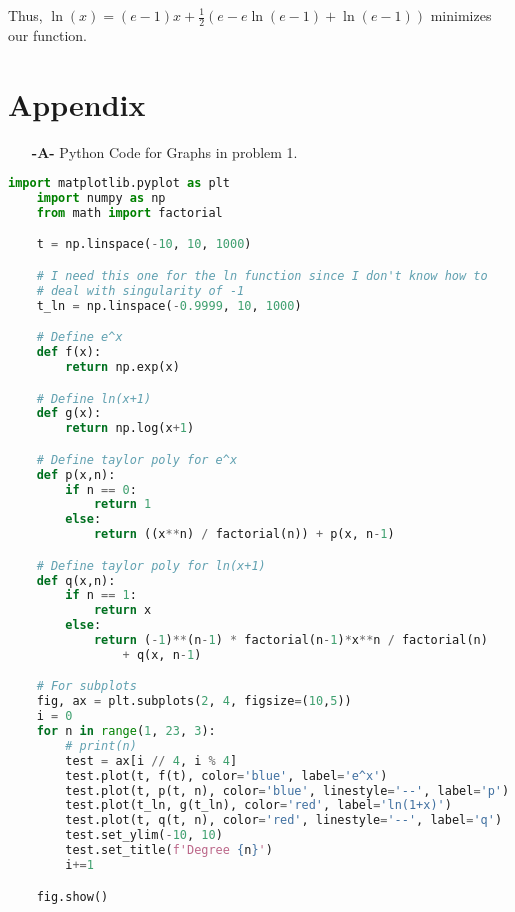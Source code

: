 \documentclass[11pt]{article}
\theoremstyle{definition}
\newcommand{\1}[1]{\mathbf{1} \left \{ #1 \right \}}
\begin{document}
Thus, \(\ln(x) = (e - 1)x + \frac{1}{2}\left(e - e\ln(e-1) + \ln(e-1)\right)\) minimizes our function.

\pagebreak

\section{Appendix}

\begin{itemize}
    \item[{\textbf{-A-}}] Python Code for Graphs in problem 1.
\end{itemize}
\begin{lstlisting}[language=Python]
    import matplotlib.pyplot as plt
    import numpy as np
    from math import factorial

    t = np.linspace(-10, 10, 1000)

    # I need this one for the ln function since I don't know how to
    # deal with singularity of -1
    t_ln = np.linspace(-0.9999, 10, 1000)

    # Define e^x
    def f(x):
        return np.exp(x)

    # Define ln(x+1)
    def g(x):
        return np.log(x+1)

    # Define taylor poly for e^x
    def p(x,n):
        if n == 0:
            return 1
        else:
            return ((x**n) / factorial(n)) + p(x, n-1)

    # Define taylor poly for ln(x+1)
    def q(x,n):
        if n == 1:
            return x
        else:
            return (-1)**(n-1) * factorial(n-1)*x**n / factorial(n)
                + q(x, n-1)

    # For subplots
    fig, ax = plt.subplots(2, 4, figsize=(10,5))
    i = 0
    for n in range(1, 23, 3):
        # print(n)
        test = ax[i // 4, i % 4]
        test.plot(t, f(t), color='blue', label='e^x')
        test.plot(t, p(t, n), color='blue', linestyle='--', label='p')
        test.plot(t_ln, g(t_ln), color='red', label='ln(1+x)')
        test.plot(t, q(t, n), color='red', linestyle='--', label='q')
        test.set_ylim(-10, 10)
        test.set_title(f'Degree {n}')
        i+=1

    fig.show()
\end{lstlisting}
\end{document}
